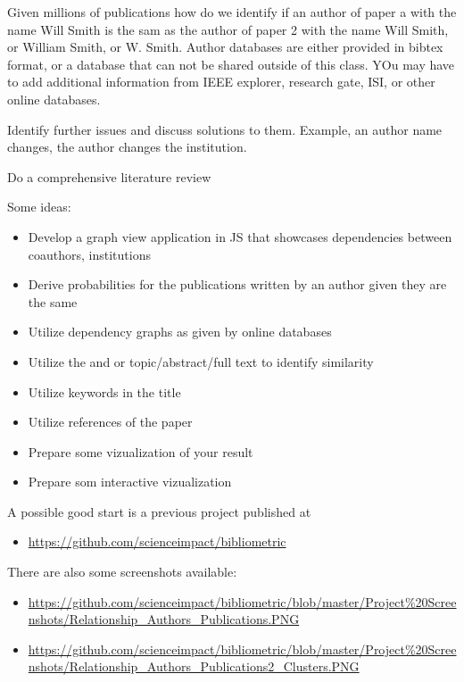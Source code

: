 Given millions of publications how do we identify if an author of paper
a with the name Will Smith is the sam as the author of paper 2 with the
name Will Smith, or William Smith, or W. Smith. Author databases are
either provided in bibtex format, or a database that can not be shared
outside of this class. YOu may have to add additional information from
IEEE explorer, research gate, ISI, or other online databases.

Identify further issues and discuss solutions to them. Example, an
author name changes, the author changes the institution.

Do a comprehensive literature review

Some ideas:

\begin{itemize}

\item
  Develop a graph view application in JS that showcases dependencies
  between coauthors, institutions
\item
  Derive probabilities for the publications written by an author given
  they are the same
\item
  Utilize dependency graphs as given by online databases
\item
  Utilize the and or topic/abstract/full text to identify similarity
\item
  Utilize keywords in the title
\item
  Utilize references of the paper
\item
  Prepare some vizualization of your result
\item
  Prepare som interactive vizualization
\end{itemize}

A possible good start is a previous project published at

\begin{itemize}

\item
  \url{https://github.com/scienceimpact/bibliometric}
\end{itemize}

There are also some screenshots available:

\begin{itemize}

\item
  \url{https://github.com/scienceimpact/bibliometric/blob/master/Project\%20Screenshots/Relationship_Authors_Publications.PNG}
\item
  \url{https://github.com/scienceimpact/bibliometric/blob/master/Project\%20Screenshots/Relationship_Authors_Publications2_Clusters.PNG}
\end{itemize}
